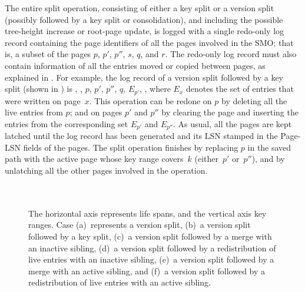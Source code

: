 The entire split operation, consisting of either a key split or a version
split (possibly followed by a key split or consolidation), and including the
possible tree-height increase or root-page update, is logged with a single
redo-only log record containing the page identifiers of all the pages
involved in the SMO; that is, a subset of the pages $p$, $p'$, $p''$, $s$,
$q$, and $r$.
The redo-only log record must also contain information of all the
entries moved or copied between pages, as explained in
. 
For example, the log record of a version split followed by a key split (shown
in ) is
, , $p$, $p'$, $p''$, $q$,
$E_{p'}$, , where $E_x$ denotes the set of entries that were
written on page~$x$. 
This operation can be redone on $p$ by deleting all the live
entries from $p$; and on pages $p'$ and $p''$ by clearing the page and
inserting the entries from the corresponding set $E_{p'}$ and $E_{p''}$. 
As usual, all the pages are kept latched until the log record has been
generated and its LSN stamped in the Page-LSN fields of the
pages. 
The split operation finishes by replacing $p$ in the saved
path with the active page whose key range covers~$k$ (either~$p'$ or~$p''$),
and by unlatching all the other pages involved in the operation.

\begin{figure}[!htb]
\begin{center}
  \\
  \\
  {The horizontal axis represents life spans, and the vertical
  axis key ranges. 
  Case 
  (a)~represents a version split, 
  (b)~a version split followed by a key split,
  (c)~a version split followed by a merge with an inactive sibling, 
  (d)~a version split followed by a redistribution of live entries
  with an inactive sibling, 
  (e)~a version split followed by a merge with an active
  sibling, and 
  (f)~a version split followed by a redistribution of live entries
  with an active sibling.}
  \label{fig:split}
\end{center}
\end{figure}


